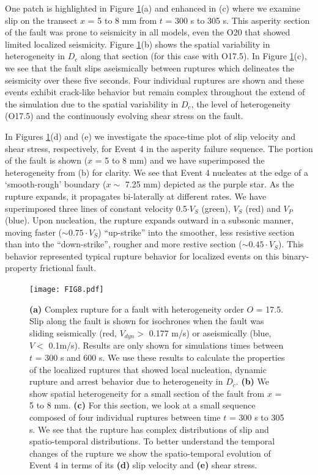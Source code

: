 \documentclass[preprint,1p, 10pt,authoryear]{elsarticle}
\begin{document}
One patch is highlighted in Figure \ref{fig8}(a) and enhanced in (c) where we examine slip on the transect $x$ = 5 to 8 mm from $t$ = 300 s to 305 s.  This asperity section of the fault was prone to seismicity in all models, even the O20 that showed limited localized seismicity. Figure \ref{fig8}(b) shows the spatial variability in heterogeneity in $D_{c}$ along that section (for this case with O17.5). In Figure \ref{fig8}(c), we see that the fault slips aseismically between ruptures which delineates the seismicity over these five seconds. Four individual ruptures are shown and these events exhibit crack-like behavior but remain complex throughout the extend of the simulation due to the spatial variability in $D_{c}$, the level of heterogeneity (O17.5) and the continuously evolving shear stress on the fault.  

In Figures \ref{fig8}(d) and (e) we investigate the space-time plot of slip velocity and shear stress, respectively, for Event 4 in the asperity failure sequence. The portion of the fault is shown ($x$ = 5 to 8 mm) and we have superimposed the heterogeneity from (b) for clarity. We see that Event 4 nucleates at the edge of a `smooth-rough' boundary ($x \sim$ 7.25 mm) depicted as the purple star. As the rupture expands, it propagates bi-laterally at different rates. We have superimposed three lines of constant velocity 0.5$\cdot V_{S}$ (green), $V_{S}$ (red) and $V_{P}$ (blue).  Upon nucleation, the rupture expands outward in a subsonic manner, moving faster ($\sim 0.75 \cdot V_{S}$) ``up-strike'' into the smoother, less resistive section than into the ``down-strike'', rougher and more restive section ($\sim 0.45\cdot V_{S}$). This behavior represented typical rupture behavior for localized events on this binary-property frictional fault.

\begin{figure}
	\centering
	\texttt{[image: FIG8.pdf]} 
	\caption{\textbf{(a)} Complex rupture for a fault with heterogeneity order $O$ = 17.5. Slip along the fault is shown for isochrones when the fault was sliding seismically (red, $V_{dyn}>$ 0.177 m/s) or aseismically (blue, $V <$ 0.1m/s).  Results are only shown for simulations times between $t$ = 300 s and 600 s. We use these results to calculate the properties of the localized ruptures that showed local nucleation, dynamic rupture and arrest behavior due to heterogeneity in $D_{c}$. \textbf{(b)} We show spatial heterogeneity for a small section of the fault from $x$ = 5 to 8 mm. \textbf{(c)} For this section, we look at a small sequence composed of four individual ruptures between time $t$ = 300 s to 305 s.  We see that the rupture has complex distributions of slip and spatio-temporal distributions. To better understand the temporal changes of the rupture we show the spatio-temporal evolution of Event 4 in terms of its \textbf{(d)} slip velocity and \textbf{(e)} shear stress.}
	\label{fig8}
\end{figure}
\end{document}
